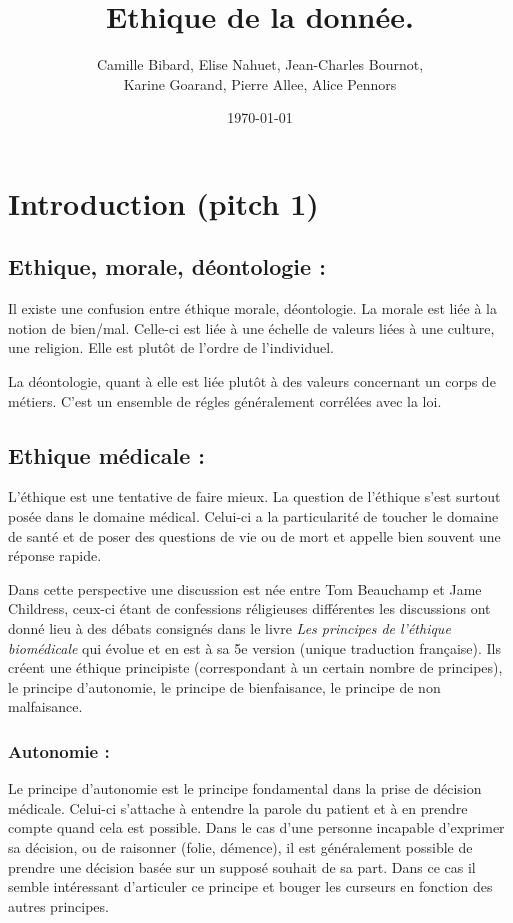 \documentclass[a4paper,12pt]{article}
\title{Ethique de la donnée.}
\date{\today}
\author{Camille Bibard, Elise Nahuet, Jean-Charles Bournot, \\ Karine Goarand, Pierre Allee, Alice Pennors}
\begin{document}
\maketitle


\section{Introduction (pitch 1)}



\subsection{Ethique, morale, déontologie : }

Il existe une confusion entre éthique morale, déontologie. La morale est liée à la notion de bien/mal. Celle-ci est liée à une échelle de valeurs liées à une culture, une religion. Elle est plutôt de l'ordre de l'individuel. 

La déontologie, quant à elle est liée plutôt à des valeurs concernant un corps de métiers. C'est un ensemble de régles généralement corrélées avec la loi. 

\subsection{Ethique médicale :}

L'éthique est une tentative de faire mieux. La question de l'éthique s'est surtout posée dans le domaine médical. Celui-ci a la particularité de toucher le domaine de santé et de poser des questions de vie ou de mort et appelle bien souvent une réponse rapide. 

Dans cette perspective une discussion est née entre Tom Beauchamp et Jame Childress, ceux-ci étant de confessions réligieuses différentes les discussions ont donné lieu à des débats consignés dans le livre \textit{Les principes de l'éthique biomédicale} qui évolue et en est à sa 5e version (unique traduction française).
Ils créent une éthique principiste (correspondant à un certain nombre de principes), le principe d'autonomie, le principe de bienfaisance, le principe de non malfaisance.

\subsubsection{Autonomie : }

Le principe d'autonomie est le principe fondamental dans la prise de décision médicale. Celui-ci s'attache à entendre la parole du patient et à en prendre compte quand cela est possible. Dans le cas d'une personne incapable d'exprimer sa décision, ou de raisonner (folie, démence), il est généralement possible de prendre une décision basée sur un supposé souhait de sa part. Dans ce cas il semble intéressant d'articuler ce principe et bouger les curseurs en fonction des autres principes. 
\end{document}

